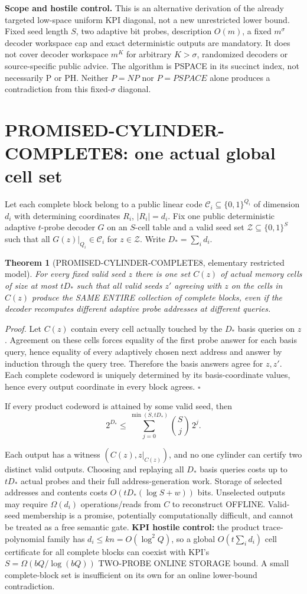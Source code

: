 \documentclass[11pt]{article}
\newtheorem{theorem}{Theorem}
\begin{document}
\noindent\textbf{Scope and hostile control.} This is an alternative derivation of the already targeted low-space uniform KPI diagonal, not a new unrestricted lower bound. Fixed seed length $S$, two adaptive bit probes, description $O(m)$, a fixed $m^\sigma$ decoder workspace cap and exact deterministic outputs are mandatory. It does not cover decoder workspace $m^K$ for arbitrary $K>\sigma$, randomized decoders or source-specific public advice. The algorithm is PSPACE in its succinct index, not necessarily P or PH. Neither $P=NP$ nor $P=PSPACE$ alone produces a contradiction from this fixed-$\sigma$ diagonal.
\section{PROMISED-CYLINDER-COMPLETE8: one actual global cell set}
Let each complete block belong to a public linear code $\mathcal C_i\subseteq\{0,1\}^{Q_i}$ of dimension $d_i$ with determining coordinates $R_i$, $|R_i|=d_i$. Fix one public deterministic adaptive $t$-probe decoder $G$ on an $S$-cell table and a valid seed set $\mathcal Z\subseteq\{0,1\}^S$ such that all $G(z)|_{Q_i}\in\mathcal C_i$ for $z\in\mathcal Z$. Write $D_*=\sum_i d_i$.
\begin{theorem}[PROMISED-CYLINDER-COMPLETE8, elementary restricted model]
For every fixed valid seed $z$ there is one set $C(z)$ of actual memory cells of size at most $tD_*$ such that all valid seeds $z'$ agreeing with $z$ on the cells in $C(z)$ produce the SAME ENTIRE collection of complete blocks, even if the decoder recomputes different adaptive probe addresses at different queries.
\end{theorem}
\noindent\emph{Proof.} Let $C(z)$ contain every cell actually touched by the $D_*$ basis queries on $z$. Agreement on these cells forces equality of the first probe answer for each basis query, hence equality of every adaptively chosen next address and answer by induction through the query tree. Therefore the basis answers agree for $z,z'$. Each complete codeword is uniquely determined by its basis-coordinate values, hence every output coordinate in every block agrees. $\square$
\begin{corollary}
If every product codeword is attained by some valid seed, then
\[
2^{D_*}\le\sum_{j=0}^{\min(S,tD_*)}\binom Sj\,2^j.
\]
\end{corollary}
\noindent Each output has a witness $(C(z),z|_{C(z)})$, and no one cylinder can certify two distinct valid outputs. Choosing and replaying all $D_*$ basis queries costs up to $tD_*$ actual probes and their full address-generation work. Storage of selected addresses and contents costs $O(tD_*(\log S+w))$ bits. Unselected outputs may require $\Omega(d_i)$ operations/reads from $C$ to reconstruct OFFLINE. Valid-seed membership is a promise, potentially computationally difficult, and cannot be treated as a free semantic gate.
\noindent\textbf{KPI hostile control:} the product trace-polynomial family has $d_i\le kn=O(\log^2 Q)$, so a global $O(t\sum_i d_i)$ cell certificate for all complete blocks can coexist with KPI's $S=\Omega(bQ/\log(bQ))$ TWO-PROBE ONLINE STORAGE bound. A small complete-block set is insufficient on its own for an online lower-bound contradiction.
\end{document}

